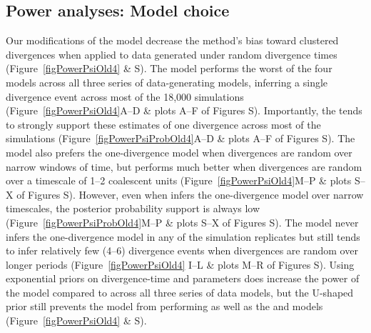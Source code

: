 \subsection*{Power analyses: Model choice}
Our modifications of the \msb model decrease the method's bias toward clustered
divergences when applied to data generated under random divergence times
(Figure~\ref{figPowerPsiOld4} \& 
S).
The \modelOld model performs the worst of the four models across
all three series of data-generating models, inferring a single divergence event across
most of the 18,000 simulations
(Figure~\ref{figPowerPsiOld4}A--D \& plots A--F of Figures
S).
Importantly, the \modelOld tends to strongly support these estimates
of one divergence across most of the simulations
(Figure~\ref{figPowerPsiProbOld4}A--D \& plots A--F of Figures
S).
The \modelDPP model also prefers the one-divergence model 
when divergences are random over narrow windows of time, but
performs much better when divergences are random over a timescale
of 1--2 coalescent units
(Figure~\ref{figPowerPsiOld4}M--P \& plots S--X of Figures
S).
However, even when \modelDPP infers the one-divergence model over narrow
timescales, the posterior probability support is always low
(Figure~\ref{figPowerPsiProbOld4}M--P \& plots S--X of Figures
S).
The \modelUniform model never infers the one-divergence model in any of the
simulation replicates but still tends to infer relatively few (4--6) divergence
events when divergences are random over longer periods 
(Figure~\ref{figPowerPsiOld4} I--L \& plots M--R of Figures
S).
Using exponential priors on divergence-time and \myTheta{} parameters does
increase the power of the \modelUshaped model compared to \modelOld across all
three series of data models, but the U-shaped prior still prevents the model
from performing as well as the \modelDPP and \modelUniform models 
(Figure~\ref{figPowerPsiOld4} \& 
S).

